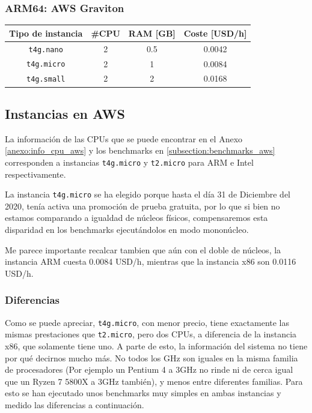 \documentclass[a4paper,openright,12pt]{article}
\begin{document}
\subsubsection{ARM64: AWS Graviton}
\begin{center}
\begin{tabular}{ | c | c | c | c | }
    \hline
    Tipo de instancia       &   \#CPU   &   RAM [GB]    &   Coste [USD/h]   \\
    \hline
    \texttt{t4g.nano}       &   2       &   0.5         &   0.0042          \\
    \hline
    \texttt{t4g.micro}      &   2       &   1           &   0.0084          \\
    \hline
    \texttt{t4g.small}      &   2       &   2           &   0.0168          \\
    \hline
\end{tabular}
\end{center}

\subsection{Instancias en AWS}\label{subsection:instancias_aws}
La información de las CPUs que se puede encontrar en el Anexo \ref{anexo:info_cpu_aws} y los benchmarks en \ref{subsection:benchmarks_aws} corresponden a
instancias \texttt{t4g.micro} y \texttt{t2.micro} para ARM e Intel respectivamente.

La instancia \texttt{t4g.micro} se ha elegido porque hasta el día 31 de Diciembre del 2020, tenía activa una promoción de prueba gratuita, por lo que si bien no estamos comparando a igualdad
de núcleos físicos, compensaremos esta disparidad en los benchmarks ejecutándolos en modo mononúcleo.

Me parece importante recalcar tambien que aún con el doble de núcleos, la instancia ARM cuesta 0.0084 USD/h, mientras que la instancia x86 son 0.0116 USD/h.

\subsubsection{Diferencias}
Como se puede apreciar, \texttt{t4g.micro}, con menor precio, tiene exactamente las mismas prestaciones que \texttt{t2.micro}, pero dos CPUs, a diferencia de la instancia x86, que solamente tiene uno.
A parte de esto, la información del sistema no tiene por qué decirnos mucho más. No todos los GHz son iguales en la misma familia de procesadores (Por ejemplo un Pentium 4 a 3GHz no rinde
ni de cerca igual que un Ryzen 7 5800X a 3GHz también), y menos entre diferentes familias. Para esto se han ejecutado unos benchmarks muy simples en ambas instancias y medido las diferencias
a continuación.
\end{document}
